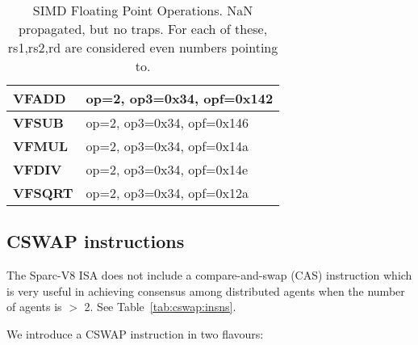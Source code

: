 \documentclass{book}
\begin{document}
\begin{table}[p]
  \centering
  \begin{tabular}[p]{|l|l|}
    \hline
    \textbf{VFADD} & {op=2, op3=0x34, opf=0x142} \\
    \hline
    \textbf{VFSUB} & {op=2, op3=0x34, opf=0x146} \\
    \hline
    \textbf{VFMUL} & {op=2, op3=0x34, opf=0x14a} \\
    \hline
    \textbf{VFDIV} & {op=2, op3=0x34, opf=0x14e} \\
    \hline
    \textbf{VFSQRT} & {op=2, op3=0x34, opf=0x12a} \\
    \hline      
  \end{tabular}
  \caption[SIMD Floating Point Operations]{SIMD Floating Point
    Operations.  NaN propagated, but no traps. For each of these,
    rs1,rs2,rd are considered even numbers pointing to.
  }
  \label{tab:simd:float:ops}
\end{table}

\subsection{CSWAP instructions}
\label{sec:cswap-instructions}

The Sparc-V8 ISA does not include a compare-and-swap (CAS) instruction
which is very  useful in achieving consensus  among distributed agents
when the number of agents is $>$ 2.  See Table~\ref{tab:cswap:insns}.

We introduce a CSWAP instruction in two flavours:
			

\end{document}
